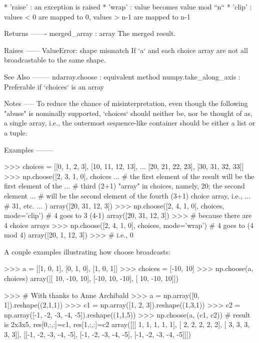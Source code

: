 \begin{DoxyVerb}
      * 'raise' : an exception is raised
      * 'wrap' : value becomes value mod ``n``
      * 'clip' : values < 0 are mapped to 0, values > n-1 are mapped to n-1

Returns
-------
merged_array : array
    The merged result.

Raises
------
ValueError: shape mismatch
    If `a` and each choice array are not all broadcastable to the same
    shape.

See Also
--------
ndarray.choose : equivalent method
numpy.take_along_axis : Preferable if `choices` is an array

Notes
-----
To reduce the chance of misinterpretation, even though the following
"abuse" is nominally supported, `choices` should neither be, nor be
thought of as, a single array, i.e., the outermost sequence-like container
should be either a list or a tuple.

Examples
--------

>>> choices = [[0, 1, 2, 3], [10, 11, 12, 13],
...   [20, 21, 22, 23], [30, 31, 32, 33]]
>>> np.choose([2, 3, 1, 0], choices
... # the first element of the result will be the first element of the
... # third (2+1) "array" in choices, namely, 20; the second element
... # will be the second element of the fourth (3+1) choice array, i.e.,
... # 31, etc.
... )
array([20, 31, 12,  3])
>>> np.choose([2, 4, 1, 0], choices, mode='clip') # 4 goes to 3 (4-1)
array([20, 31, 12,  3])
>>> # because there are 4 choice arrays
>>> np.choose([2, 4, 1, 0], choices, mode='wrap') # 4 goes to (4 mod 4)
array([20,  1, 12,  3])
>>> # i.e., 0

A couple examples illustrating how choose broadcasts:

>>> a = [[1, 0, 1], [0, 1, 0], [1, 0, 1]]
>>> choices = [-10, 10]
>>> np.choose(a, choices)
array([[ 10, -10,  10],
       [-10,  10, -10],
       [ 10, -10,  10]])

>>> # With thanks to Anne Archibald
>>> a = np.array([0, 1]).reshape((2,1,1))
>>> c1 = np.array([1, 2, 3]).reshape((1,3,1))
>>> c2 = np.array([-1, -2, -3, -4, -5]).reshape((1,1,5))
>>> np.choose(a, (c1, c2)) # result is 2x3x5, res[0,:,:]=c1, res[1,:,:]=c2
array([[[ 1,  1,  1,  1,  1],
        [ 2,  2,  2,  2,  2],
        [ 3,  3,  3,  3,  3]],
       [[-1, -2, -3, -4, -5],
        [-1, -2, -3, -4, -5],
        [-1, -2, -3, -4, -5]]])\end{DoxyVerb}
 \mbox{\label{namespacenumpy_1_1core_1_1fromnumeric_a7e3b09620f5b7f5234b4751a572b8535}} 
